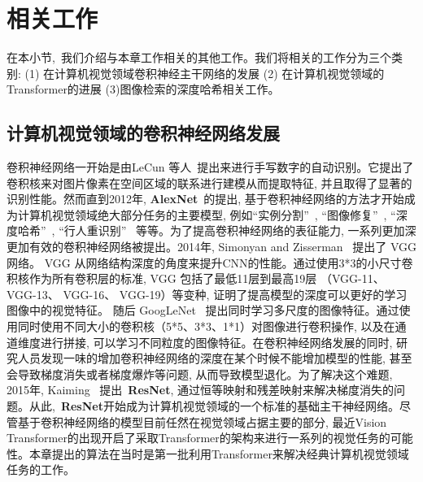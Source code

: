 \section{相关工作}
在本小节,~我们介绍与本章工作相关的其他工作。我们将相关的工作分为三个类别: (1) 在计算机视觉领域卷积神经主干网络的发展 (2) 在计算机视觉领域的Transformer的进展 (3)图像检索的深度哈希相关工作。
\subsection{计算机视觉领域的卷积神经网络发展}
卷积神经网络一开始是由LeCun 等人~\cite{cnnoriginal}提出来进行手写数字的自动识别。它提出了卷积核来对图片像素在空间区域的联系进行建模从而提取特征, 并且取得了显著的识别性能。然而直到2012年, \textbf{AlexNet}~\cite{alexnet}的提出, 基于卷积神经网络的方法才开始成为计算机视觉领域绝大部分任务的主要模型, 例如``实例分割''~\cite{he2016deep, ren2017end}, ``图像修复''~\cite{yeh2017semantic,yu2019free}, ``深度哈希''~\cite{cao2018deep, cao2017hashnet}, ``行人重识别''~\cite{chen2020maenet, hermans2017defense, ye2018hierarchical, ye2018visible} 等等。为了提高卷积神经网络的表征能力, 一系列更加深更加有效的卷积神经网络被提出。2014年, Simonyan and Zisserman~\cite{simonyan2014very} 提出了 VGG 网络。 VGG 从网络结构深度的角度来提升CNN的性能。通过使用3*3的小尺寸卷积核作为所有卷积层的标准, VGG 包括了最低11层到最高19层 （VGG-11、 VGG-13、 VGG-16、 VGG-19）等变种, 证明了提高模型的深度可以更好的学习图像中的视觉特征。 随后 GoogLeNet~\cite{szegedy2015going} 提出同时学习多尺度的图像特征。通过使用同时使用不同大小的卷积核（5*5、3*3、1*1）对图像进行卷积操作, 以及在通道维度进行拼接, 可以学习不同粒度的图像特征。在卷积神经网络发展的同时, 研究人员发现一味的增加卷积神经网络的深度在某个时候不能增加模型的性能, 甚至会导致梯度消失或者梯度爆炸等问题, 从而导致模型退化。为了解决这个难题, 2015年, Kaiming~\cite{he2016deep} 提出~\textbf{ResNet}, 通过恒等映射和残差映射来解决梯度消失的问题。从此,~\textbf{ResNet}开始成为计算机视觉领域的一个标准的基础主干神经网络。尽管基于卷积神经网络的模型目前任然在视觉领域占据主要的部分, 最近Vision Transformer的出现开启了采取Transformer的架构来进行一系列的视觉任务的可能性。本章提出的算法在当时是第一批利用Transformer来解决经典计算机视觉领域任务的工作。\par
